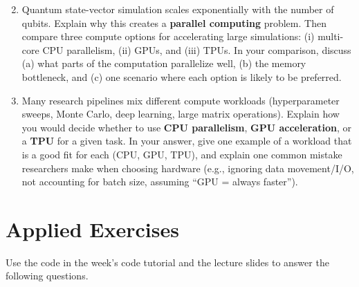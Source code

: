 \documentclass[11pt]{article}
\begin{document}
\begin{enumerate}
\setcounter{enumi}{1}

\item Quantum state-vector simulation scales exponentially with the number of qubits. Explain why this creates a \textbf{parallel computing} problem. Then compare three compute options for accelerating large simulations: (i) multi-core CPU parallelism, (ii) GPUs, and (iii) TPUs. In your comparison, discuss (a) what parts of the computation parallelize well, (b) the memory bottleneck, and (c) one scenario where each option is likely to be preferred.

\item Many research pipelines mix different compute workloads (hyperparameter sweeps, Monte Carlo, deep learning, large matrix operations). Explain how you would decide whether to use \textbf{CPU parallelism}, \textbf{GPU acceleration}, or a \textbf{TPU} for a given task. In your answer, give one example of a workload that is a good fit for each (CPU, GPU, TPU), and explain one common mistake researchers make when choosing hardware (e.g., ignoring data movement/I/O, not accounting for batch size, assuming ``GPU = always faster'').

  \end{enumerate}


\section*{Applied Exercises}
Use the code in the week's code tutorial and the lecture slides to answer the following questions.\bigskip
\end{document}
